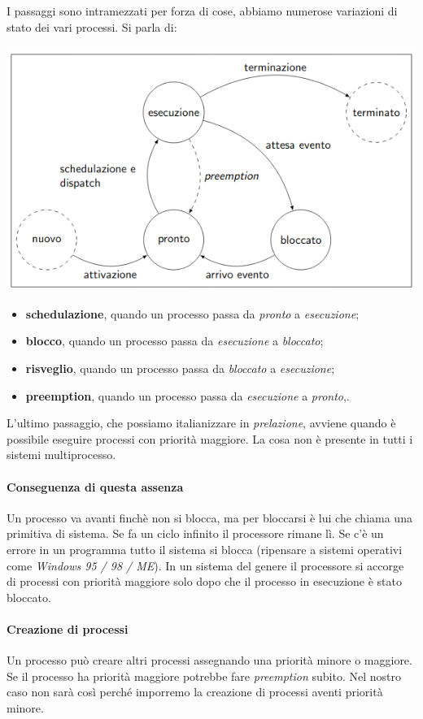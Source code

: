 \documentclass[11pt]{report}
\theoremstyle{definition}
\begin{document}
I passaggi sono intramezzati per forza di cose, abbiamo numerose variazioni di stato dei vari processi. Si parla di:
\begin{center}\includegraphics[scale=.76]{img/198.PNG}\end{center}
\begin{itemize}
	\item \textbf{schedulazione}, quando un processo passa da \emph{pronto} a \emph{esecuzione};
	\item \textbf{blocco}, quando un processo passa da \emph{esecuzione} a \emph{bloccato};
	\item \textbf{risveglio}, quando un processo passa da \emph{bloccato} a \emph{esecuzione};
	\item \textbf{preemption}, quando un processo passa da \emph{esecuzione} a \emph{pronto},.
\end{itemize}
L'ultimo passaggio, che possiamo italianizzare in \emph{prelazione}, avviene quando è possibile eseguire processi con priorità maggiore. La cosa non è presente in tutti i sistemi multiprocesso.
\paragraph{Conseguenza di questa assenza}  Un processo va avanti finchè non si blocca, ma per bloccarsi è lui che chiama una primitiva di sistema. Se fa un ciclo infinito il processore rimane lì. Se c'è un errore in un programma  tutto il sistema si blocca (ripensare a sistemi operativi come \emph{Windows 95 / 98 / ME}). In un sistema del genere il processore si accorge di processi con priorità maggiore solo dopo che il processo in esecuzione è stato bloccato.
\paragraph{Creazione di processi} Un processo può creare altri processi assegnando una priorità minore o maggiore. Se il processo ha priorità maggiore potrebbe fare \emph{preemption} subito. Nel nostro caso non sarà così perché imporremo la creazione di processi aventi priorità minore.
\end{document}
